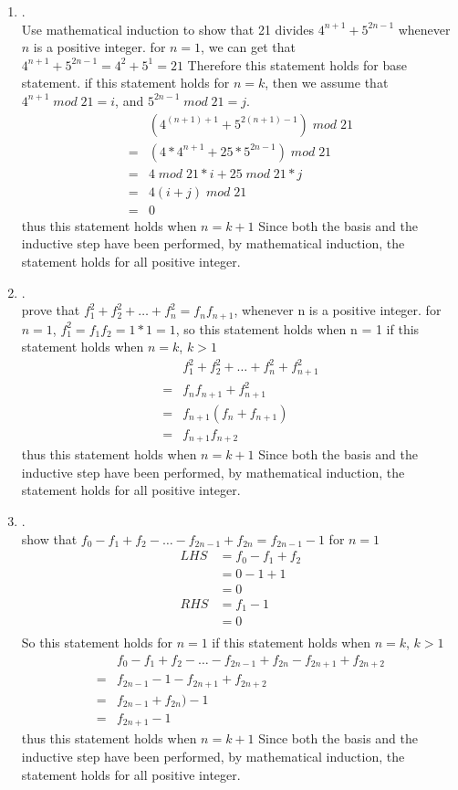\documentclass{article}
\theoremstyle{definition}
\theoremstyle{plain}
\begin{document}
\begin {enumerate}[itemindent=30pt,label=\bf Exercise {\arabic*}:]
\item .\\
Use mathematical induction to show that 21 divides $4^{n+1} + 5^{2n-1}$ whenever $n$ is a positive integer.
\subitem for $n = 1$, we can get that $4^{n+1} + 5^{2n-1} = 4^2 + 5^1 = 21$
\subitem Therefore this statement holds for base statement.
\subitem if this statement holds for $n = k$, then we assume that $4^{n+1} \;mod\; 21 = i$, and $5^{2n-1}\;mod\; 21 = j$.
\begin{align*}
	&(4^{(n+1) + 1} + 5^{2(n+1) -1}) \;mod\; 21\\
	=&(4*4^{n+1} + 25*5^{2n-1}) \;mod\; 21\\
	=& 4\;mod\;21 * i + 25\;mod\;21*j\\
	=& 4(i + j) \;mod\; 21\\
	=& 0
\end{align*}
\subitem thus this statement holds when $n = k+1$
\subitem Since both the basis and the inductive step have been performed, by mathematical induction, the statement holds for all positive integer.
\item .\\prove that $f_{1}^{2} + f_{2}^{2} + \ldots + f_{n}^{2} = f_{n}f_{n+1}$, whenever n is a positive integer.
\subitem for $n = 1$, $f_1^2 = f_1 f_2 = 1*1 = 1$, so this statement holds when n = 1
\subitem if this statement holds when $n = k$, $k > 1$
\begin{align*}
	&f_{1}^{2} + f_{2}^{2} + \ldots + f_{n}^{2} + f_{n+1}^2\\
	=&f_n f_{n+1} + f_{n+1}^2\\
	= &f_{n+1}(f_{n}+ f_{n+1})\\
	= &f_{n+1}f_{n+2}
\end{align*}
\subitem thus this statement holds when $n = k+1$
\subitem Since both the basis and the inductive step have been performed, by mathematical induction, the statement holds for all positive integer.
\item .\\
show that $f_{0} - f_{1} + f_{2} - \ldots - f_{2n-1} + f_{2n} = f_{2n-1} -1$
\subitem for $n = 1$
\begin{align*}
	LHS &= f_{0} - f_{1} + f_{2}\\
		&= 0 - 1 + 1\\
		&=0\\
	RHS &= f_{1} -1\\
		&= 0\\
\end{align*}
\subitem So this statement holds for $n = 1$
\subitem if this statement holds when $n = k$, $k > 1$
\begin{align*}
	&f_{0} - f_{1} + f_{2} - \ldots - f_{2n-1} + f_{2n} - f_{2n+1} + f_{2n + 2} \\
	=&f_{2n-1}-1 - f_{2n+1} + f_{2n + 2}\\
	=& f_{2n-1}+ f_{2n}) - 1\\
	=&f_{2n+1} -1
\end{align*}
\subitem thus this statement holds when $n = k+1$
\subitem Since both the basis and the inductive step have been performed, by mathematical induction, the statement holds for all positive integer.


\end{enumerate}
\end{document}
